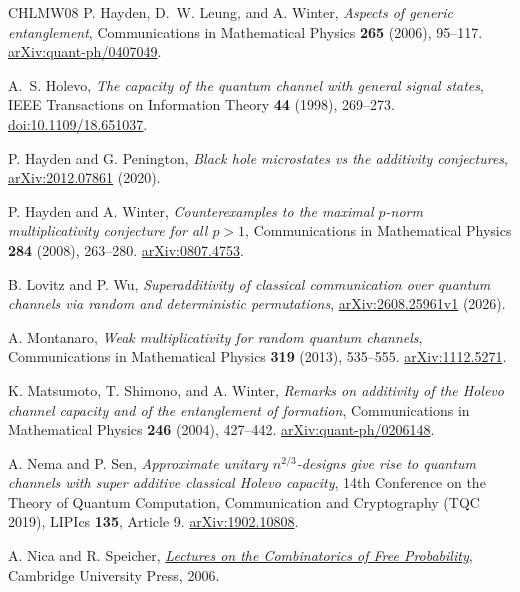 \documentclass[11pt]{article}
\numberwithin{equation}{section}
\theoremstyle{boldremark}\newtheorem{remark}[theorem]{Remark}
\begin{document}
\begin{thebibliography}{CHLMW08}
P. Hayden, D.~W. Leung, and A. Winter,
\emph{Aspects of generic entanglement},
Communications in Mathematical Physics \textbf{265} (2006), 95--117.
\href{https://arxiv.org/abs/quant-ph/0407049}{arXiv:quant-ph/0407049}.

A.~S. Holevo,
\emph{The capacity of the quantum channel with general signal states},
IEEE Transactions on Information Theory \textbf{44} (1998), 269--273.
\href{https://doi.org/10.1109/18.651037}{doi:10.1109/18.651037}.

P. Hayden and G. Penington,
\emph{Black hole microstates vs the additivity conjectures},
\href{https://arxiv.org/abs/2012.07861}{arXiv:2012.07861} (2020).

P. Hayden and A. Winter,
\emph{Counterexamples to the maximal $p$-norm multiplicativity conjecture
for all $p>1$},
Communications in Mathematical Physics \textbf{284} (2008), 263--280.
\href{https://arxiv.org/abs/0807.4753}{arXiv:0807.4753}.

B. Lovitz and P. Wu,
\emph{Superadditivity of classical communication over quantum channels
via random and deterministic permutations},
\href{https://arxiv.org/abs/2608.25961v1}{arXiv:2608.25961v1} (2026).

A. Montanaro,
\emph{Weak multiplicativity for random quantum channels},
Communications in Mathematical Physics \textbf{319} (2013), 535--555.
\href{https://arxiv.org/abs/1112.5271}{arXiv:1112.5271}.

K. Matsumoto, T. Shimono, and A. Winter,
\emph{Remarks on additivity of the Holevo channel capacity and of the entanglement of formation},
Communications in Mathematical Physics \textbf{246} (2004), 427--442.
\href{https://arxiv.org/abs/quant-ph/0206148}{arXiv:quant-ph/0206148}.

A. Nema and P. Sen,
\emph{Approximate unitary $n^{2/3}$-designs give rise to quantum channels with super additive classical Holevo capacity},
14th Conference on the Theory of Quantum Computation, Communication and Cryptography (TQC 2019), LIPIcs \textbf{135}, Article 9.
\href{https://arxiv.org/abs/1902.10808}{arXiv:1902.10808}.

A. Nica and R. Speicher,
\href{https://rolandspeicher.com/wp-content/uploads/2020/06/nica-speicher-book.pdf}{\emph{Lectures on the Combinatorics of Free Probability}},
Cambridge University Press, 2006.


\end{thebibliography}
\end{document}
